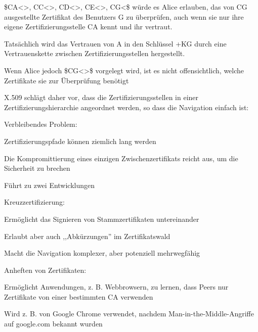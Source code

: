 \documentclass[a4paper]{article}
\begin{document}
\begin{multicols}{3}
\begin{itemize*}
            \begin{itemize*}
                  \item \$CA\textless{}\textgreater, CC\textless{}\textgreater, CD\textless{}\textgreater, CE\textless{}\textgreater, CG\textless{}\$ würde es Alice erlauben, das von CG ausgestellte Zertifikat des Benutzers G zu überprüfen, auch wenn sie nur ihre eigene Zertifizierungsstelle CA kennt und ihr vertraut.
                  \item Tatsächlich wird das Vertrauen von A in den Schlüssel +KG durch eine Vertrauenskette zwischen Zertifizierungsstellen hergestellt.
                  \item Wenn Alice jedoch \$CG\textless{}\textgreater\$ vorgelegt wird, ist es nicht offensichtlich, welche Zertifikate sie zur Überprüfung benötigt
            \end{itemize*}
            \item
            X.509 schlägt daher vor, dass die Zertifizierungsstellen in einer
            Zertifizierungshierarchie angeordnet werden, so dass die Navigation
            einfach ist:

            \item
            Verbleibendes Problem:

            \begin{itemize*}
                  \item Zertifizierungspfade können ziemlich lang werden
                  \item Die Kompromittierung eines einzigen Zwischenzertifikats reicht aus, um die Sicherheit zu brechen
            \end{itemize*}
            \item
            Führt zu zwei Entwicklungen

            \begin{itemize*}
                  \item Kreuzzertifizierung:
                  \begin{itemize*} \item Ermöglicht das Signieren von Stammzertifikaten untereinander \item Erlaubt aber auch ,,Abkürzungen'' im Zertifikatswald \item Macht die Navigation komplexer, aber potenziell mehrwegfähig \end{itemize*}
                  \item Anheften von Zertifikaten:
                  \begin{itemize*} \item Ermöglicht Anwendungen, z. B. Webbrowsern, zu lernen, dass Peers nur Zertifikate von einer bestimmten CA verwenden \item Wird z. B. von Google Chrome verwendet, nachdem Man-in-the-Middle-Angriffe auf google.com bekannt wurden \end{itemize*}
            \end{itemize*}
      \end{itemize*}



\end{multicols}
\end{document}
